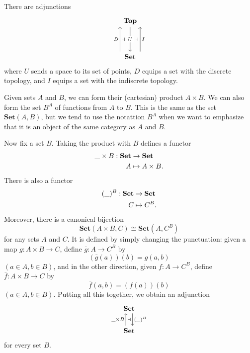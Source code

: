 \begin{example}
    There are adjunctions
    \begin{equation*}
    \begin{tikzcd}
        \bcat{Top} \arrow[dd, "U" description] \\ \\
        \bcat{Set} \arrow[uu, shift left=6, "D", "\dashv"'] \arrow[uu, shift right=6, "I"', "\dashv"]
    \end{tikzcd}
    \end{equation*}
    where $U$ sends a space to its set of points, $D$ equips a set with the discrete topology, and $I$ equips a set with the indiscrete topology.
\end{example}
\begin{example}
    Given sets $A$ and $B$, we can form their (cartesian) product $A\times B$. We can also form the set $B^A$ of functions from $A$ to $B$. This is the same as the set $\textbf{Set}(A,B)$, but we tend to use the notattion $B^A$ when we want to emphasize that it is an object of the same category as $A$ and $B$.\par
    Now fix a set $B$. Taking the product with $B$ defines a functor
    \begin{align*}
        \_\times B: \mathbf{Set} &\to \mathbf{Set} \\
        A &\mapsto A\times B.
    \end{align*}
    There is also a functor
    \begin{align*}
        (\_)^B: \mathbf{Set} &\to \mathbf{Set} \\
        C &\mapsto C^B.
    \end{align*}
    Moreover, there is a canonical bijection
    $$ \textbf{Set}(A\times B, C) \cong \textbf{Set}(A, C^B)$$
    for any sets $A$ and $C$. It is defined by simply changing the punctuation: given a map $g:A\times B\to C$, define $\bar{g}: A\to C^B$ by
    $$(\bar{g}(a))(b) = g(a,b)$$
    $(a\in A, b\in B)$, and in the other direction, given $f:A\to C^B$, define $\bar{f}:A\times B\to C$ by
    $$\bar{f}(a,b)=(f(a))(b)$$
    $(a\in A, b\in B)$. Putting all this together, we obtain an adjunction
    \begin{equation*}
    \begin{tikzcd}
        \bcat{Set} \arrow[d, shift left=2, "(\_)^B"] \\
        \bcat{Set} \arrow[u, shift left=2, "\_\times B", "\dashv"']
    \end{tikzcd}
    \end{equation*}
    for every set $B$.
\end{example}

